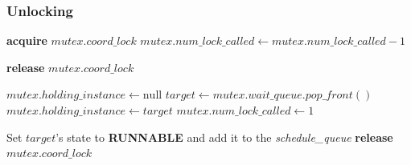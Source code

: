 \documentclass[a4paper,12pt,fleqn]{article}
\begin{document}
\subsubsection{Unlocking}
\begin{algorithmic}[1]
    \State \textbf{acquire} $mutex.coord\_lock$
    \State $mutex.num\_lock\_called \gets mutex.num\_lock\_called - 1$
    
        \State \textbf{release} $mutex.coord\_lock$
        \State \Return
    \EndIf

        \State $mutex.holding\_instance \gets \text{null}$
    \Else
        \State $target \gets mutex.wait\_queue.pop\_front()$
        \State $mutex.holding\_instance \gets target$
        \State $mutex.num\_lock\_called \gets 1$
        
        \State Set $target$'s state to \textbf{RUNNABLE} and add it to the \textit{schedule\_queue}
    \EndIf
    \State \textbf{release} $mutex.coord\_lock$
\EndProcedure
\end{algorithmic}
\end{document}
